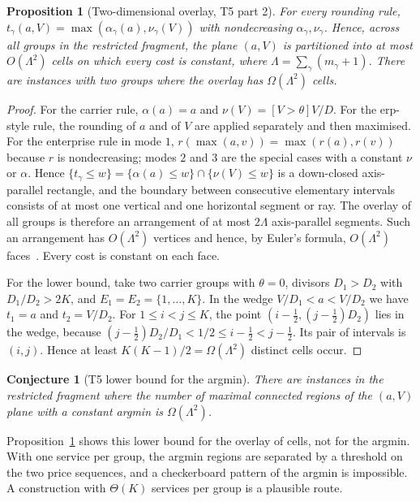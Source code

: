 \documentclass[11pt]{article}
\newtheorem{proposition}[theorem]{Proposition}
\newtheorem{conjecture}[theorem]{Conjecture}
\theoremstyle{definition}
\theoremstyle{remark}
\begin{document}
\begin{proposition}[Two-dimensional overlay, T5 part 2]\label{prop:T5b}
For every rounding rule, $t_\gamma(a,V)=\max(\alpha_\gamma(a),\nu_\gamma(V))$ with nondecreasing
$\alpha_\gamma,\nu_\gamma$. Hence, across all groups in the restricted fragment, the plane
$(a,V)$ is partitioned into at most $O(\Lambda^2)$ cells on which every cost is constant,
where $\Lambda=\sum_\gamma(m_\gamma+1)$. There are instances with two groups where the overlay
has $\Omega(\Lambda^2)$ cells.
\end{proposition}
\begin{proof}
For the carrier rule, $\alpha(a)=a$ and $\nu(V)=[V>\theta]V/D$. For the erp-style rule, the
rounding of $a$ and of $V$ are applied separately and then maximised. For the enterprise
rule in mode $1$, $r(\max(a,v))=\max(r(a),r(v))$ because $r$ is nondecreasing; modes $2$
and $3$ are the special cases with a constant $\nu$ or $\alpha$. Hence
$\{t_\gamma\le w\}=\{\alpha(a)\le w\}\cap\{\nu(V)\le w\}$ is a down-closed axis-parallel
rectangle, and the boundary between consecutive elementary intervals consists of at
most one vertical and one horizontal segment or ray. The overlay of all groups is
therefore an arrangement of at most $2\Lambda$ axis-parallel segments. Such an arrangement
has $O(\Lambda^2)$ vertices and hence, by Euler's formula, $O(\Lambda^2)$
faces~\cite{deberg2008computational}. Every cost is constant on each face.

For the lower bound, take two carrier groups with $\theta=0$, divisors $D_1>D_2$ with
$D_1/D_2>2K$, and $E_1=E_2=\{1,\dots,K\}$. In the wedge $V/D_1<a<V/D_2$ we have
$t_1=a$ and $t_2=V/D_2$. For $1\le i<j\le K$, the point $(i-\tfrac12,(j-\tfrac12)D_2)$ lies in
the wedge, because $(j-\tfrac12)D_2/D_1<1/2\le i-\tfrac12<j-\tfrac12$. Its pair of intervals is
$(i,j)$. Hence at least $K(K-1)/2=\Omega(\Lambda^2)$ distinct cells occur.
\end{proof}

\begin{conjecture}[T5 lower bound for the argmin]\label{conj:T5}
There are instances in the restricted fragment where the number of maximal connected
regions of the $(a,V)$ plane with a constant argmin is $\Omega(\Lambda^2)$.
\end{conjecture}
Proposition~\ref{prop:T5b} shows this lower bound for the overlay of cells, not for the
argmin. With one service per group, the argmin regions are separated by a threshold on
the two price sequences, and a checkerboard pattern of the argmin is impossible. A
construction with $\Theta(K)$ services per group is a plausible route.
\end{document}
